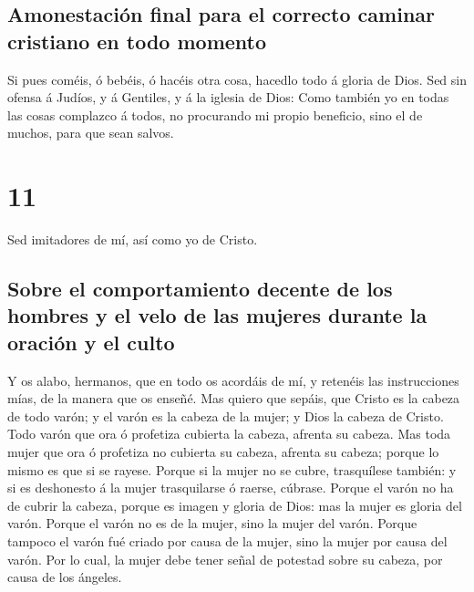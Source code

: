 \hypertarget{amonestaciuxf3n-final-para-el-correcto-caminar-cristiano-en-todo-momento}{%
\subsection{Amonestación final para el correcto caminar cristiano en
todo
momento}\label{amonestaciuxf3n-final-para-el-correcto-caminar-cristiano-en-todo-momento}}

 Si pues coméis, ó bebéis, ó hacéis otra cosa, hacedlo todo
á gloria de Dios.  Sed sin ofensa á Judíos, y á Gentiles, y
á la iglesia de Dios:  Como también yo en todas las cosas
complazco á todos, no procurando mi propio beneficio, sino el de muchos,
para que sean salvos.

\hypertarget{section-10}{%
\section{11}\label{section-10}}

 Sed imitadores de mí, así como yo de Cristo.

\hypertarget{sobre-el-comportamiento-decente-de-los-hombres-y-el-velo-de-las-mujeres-durante-la-oraciuxf3n-y-el-culto}{%
\subsection{Sobre el comportamiento decente de los hombres y el velo de
las mujeres durante la oración y el
culto}\label{sobre-el-comportamiento-decente-de-los-hombres-y-el-velo-de-las-mujeres-durante-la-oraciuxf3n-y-el-culto}}

 Y os alabo, hermanos, que en todo os acordáis de mí, y
retenéis las instrucciones mías, de la manera que os enseñé.
 Mas quiero que sepáis, que Cristo es la cabeza de todo
varón; y el varón es la cabeza de la mujer; y Dios la cabeza de Cristo.
 Todo varón que ora ó profetiza cubierta la cabeza, afrenta
su cabeza.  Mas toda mujer que ora ó profetiza no cubierta
su cabeza, afrenta su cabeza; porque lo mismo es que si se rayese.
 Porque si la mujer no se cubre, trasquílese también: y si
es deshonesto á la mujer trasquilarse ó raerse, cúbrase. 
Porque el varón no ha de cubrir la cabeza, porque es imagen y gloria de
Dios: mas la mujer es gloria del varón.  Porque el varón no
es de la mujer, sino la mujer del varón.  Porque tampoco el
varón fué criado por causa de la mujer, sino la mujer por causa del
varón.  Por lo cual, la mujer debe tener señal de potestad
sobre su cabeza, por causa de los ángeles.

